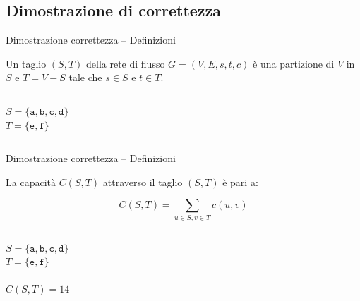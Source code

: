 \subsection{Dimostrazione di correttezza}

\begin{frame}{Dimostrazione correttezza -- Definizioni}

\vspace{-12pt}
\begin{myboxtitle}[Taglio]
Un \alert{taglio} $(S,T)$ della rete di flusso 
$G=(V,E,s,t,c)$ è una partizione di $V$ in $S$ e $T=V-S$
tale che $s \in S$ e $t \in T$.
\end{myboxtitle}

\vspace{-12pt}
\begin{columns}[T]
\vspace{18pt}
$S = \{ \mathtt{a}, \mathtt{b}, \mathtt{c}, \mathtt{d} \}$\\
$T = \{ \mathtt{e}, \mathtt{f} \}$\\
\end{columns}


\end{frame}


\begin{frame}{Dimostrazione correttezza -- Definizioni}

\vspace{-12pt}
\begin{myboxtitle}
La \alert{capacità} $C(S,T)$ attraverso il taglio $(S,T)$ è pari a:

\[
  C(S,T) = \sum_{u \in S, v \in T} c(u,v)
\]
\end{myboxtitle}

\vspace{-12pt}
\begin{columns}[T]
\vspace{18pt}
$S = \{ \mathtt{a}, \mathtt{b}, \mathtt{c}, \mathtt{d} \}$\\
$T = \{ \mathtt{e}, \mathtt{f} \}$\\
~\\
$C(S,T) = 14$
\end{columns}

\end{frame}

